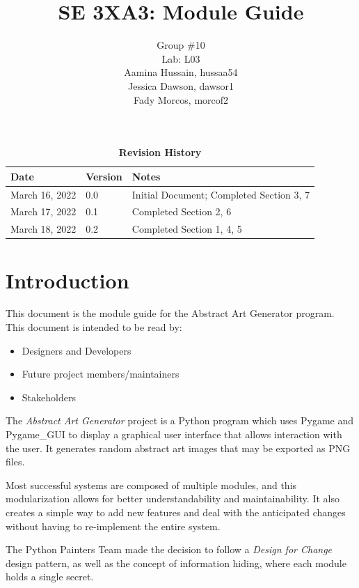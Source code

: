 \documentclass[12pt, titlepage]{article}
\title{SE 3XA3: Module Guide}
\author{Group \#10
        \\Lab: L03
		\\ Aamina Hussain, hussaa54
		\\ Jessica Dawson, dawsor1
		\\ Fady Morcos, morcof2
}
\date{}
\begin{document}
\maketitle

\tableofcontents
\listoftables
\listoffigures

\begin{table}[h!]
\caption{\bf Revision History}
\begin{tabularx}{\textwidth}{p{3cm}p{2cm}X}
\toprule {\bf Date} & {\bf Version} & {\bf Notes}\\
\midrule
March 16, 2022 & 0.0 & Initial Document; Completed Section 3, 7\\
March 17, 2022 & 0.1 & Completed Section 2, 6\\
March 18, 2022 & 0.2 & Completed Section 1, 4, 5\\
\bottomrule
\end{tabularx}
\end{table}

\newpage


\section{Introduction}

This document is the module guide for the Abstract Art Generator program. This document is intended to be read by:

\begin{itemize}
  \item Designers and Developers
  \item Future project members/maintainers
  \item Stakeholders
\end{itemize}

The \emph{Abstract Art Generator} project is a Python program which uses Pygame and Pygame\_GUI to display a graphical user interface that allows interaction with the user. It generates random abstract art images that may be exported as PNG files. 

Most successful systems are composed of multiple modules, and this modularization allows for better understandability and maintainability. It also creates a simple way to add new features and deal with the anticipated changes without having to re-implement the entire system.

The Python Painters Team made the decision to follow a \emph{Design for Change} design pattern, as well as the concept of information hiding, where each module holds a single secret.
\end{document}

